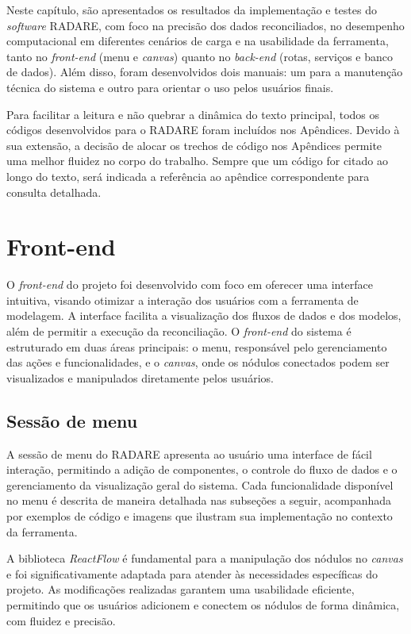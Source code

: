 \label{Cap:Resultados}

Neste capítulo, são apresentados os resultados da implementação e testes do \textit{software} RADARE, com foco na precisão dos dados reconciliados, no desempenho computacional em diferentes cenários de carga e na usabilidade da ferramenta, tanto no \textit{front-end} (menu e \textit{canvas}) quanto no \textit{back-end} (rotas, serviços e banco de dados). Além disso, foram desenvolvidos dois manuais: um para a manutenção técnica do sistema e outro para orientar o uso pelos usuários finais.

Para facilitar a leitura e não quebrar a dinâmica do texto principal, todos os códigos desenvolvidos para o RADARE foram incluídos nos Apêndices. Devido à sua extensão, a decisão de alocar os trechos de código nos Apêndices permite uma melhor fluidez no corpo do trabalho. Sempre que um código for citado ao longo do texto, será indicada a referência ao apêndice correspondente para consulta detalhada.

\section{Front-end} 

O \textit{front-end} do projeto  foi desenvolvido com foco em oferecer uma interface intuitiva, visando otimizar a interação dos usuários com a ferramenta de modelagem. A interface facilita a visualização dos fluxos de dados e dos modelos, além de permitir a execução da reconciliação. O  \textit{front-end} do sistema é estruturado em duas áreas principais: o menu, responsável pelo gerenciamento das ações e funcionalidades, e o \textit{canvas}, onde os nódulos conectados podem ser visualizados e manipulados diretamente pelos usuários.

\subsection{Sessão de menu} 

A sessão de menu do RADARE apresenta ao usuário uma interface de fácil interação, permitindo a adição de componentes, o controle do fluxo de dados e o gerenciamento da visualização geral do sistema. Cada funcionalidade disponível no menu é descrita de maneira detalhada nas subseções a seguir, acompanhada por exemplos de código e imagens que ilustram sua implementação no contexto da ferramenta.

A biblioteca \textit{ReactFlow} \cite{reactflow} é fundamental para a manipulação dos nódulos no \textit{canvas} e foi significativamente adaptada para atender às necessidades específicas do projeto. As modificações realizadas garantem uma usabilidade eficiente, permitindo que os usuários adicionem e conectem os nódulos de forma dinâmica, com fluidez e precisão.

